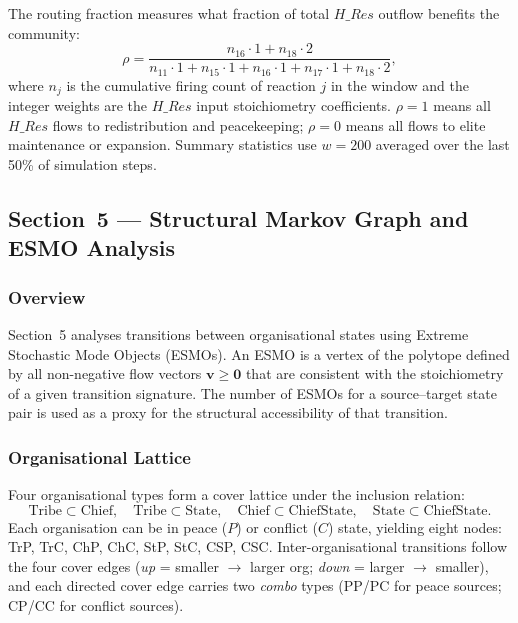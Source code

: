The routing fraction measures what fraction of total $H\_\textit{Res}$
outflow benefits the community:
\begin{equation}
    \rho = \frac{n_{16} \cdot 1 + n_{18} \cdot 2}
               {n_{11} \cdot 1 + n_{15} \cdot 1 + n_{16} \cdot 1
                + n_{17} \cdot 1 + n_{18} \cdot 2},
\end{equation}
where $n_j$ is the cumulative firing count of reaction $j$ in the window
and the integer weights are the $H\_\textit{Res}$ input stoichiometry
coefficients.  $\rho = 1$ means all $H\_\textit{Res}$ flows to redistribution
and peacekeeping; $\rho = 0$ means all flows to elite maintenance or
expansion.  Summary statistics use $w = 200$ averaged over the last 50\%
of simulation steps.

\subsection{Section~5 — Structural Markov Graph and ESMO Analysis}
\label{app:sec5}

\subsubsection*{Overview}

Section~5 analyses transitions between organisational states using
Extreme Stochastic Mode Objects (ESMOs).  An ESMO is a vertex of the
polytope defined by all non-negative flow vectors
$\mathbf{v} \geq \mathbf{0}$ that are consistent with the stoichiometry
of a given transition signature.  The number of ESMOs for a source--target
state pair is used as a proxy for the structural accessibility of that
transition.

\subsubsection*{Organisational Lattice}

Four organisational types form a cover lattice under the inclusion relation:
\begin{equation*}
    \text{Tribe} \subset \text{Chief},\quad
    \text{Tribe} \subset \text{State},\quad
    \text{Chief} \subset \text{ChiefState},\quad
    \text{State} \subset \text{ChiefState}.
\end{equation*}
Each organisation can be in peace ($P$) or conflict ($C$) state, yielding
eight nodes: TrP, TrC, ChP, ChC, StP, StC, CSP, CSC.
Inter-organisational transitions follow the four cover edges
(\emph{up} = smaller $\to$ larger org; \emph{down} = larger $\to$ smaller),
and each directed cover edge carries two \emph{combo} types (PP/PC for peace
sources; CP/CC for conflict sources).

